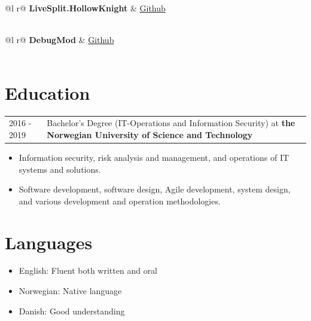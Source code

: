\documentclass[a4paper,12pt]{article}
\begin{document}
\begin{tabularx}{\linewidth}{ @{}l r@{} }
\textbf{LiveSplit.HollowKnight} & \hfill \href{https://github.com/ShootMe/LiveSplit.HollowKnight/tree/master}{Github} \\[3.75pt]
  \\
\end{tabularx}

\begin{tabularx}{\linewidth}{ @{}l r@{} }
\textbf{DebugMod} & \hfill \href{https://github.com/cerpintext/DebugMod}{Github} \\[3.75pt]
  \\
\end{tabularx}

\section{Education}
\begin{tabularx}{\linewidth}{@{}l X@{}}	

2016 - 2019 & Bachelor's Degree (IT-Operations and Information Security) at \textbf{the Norwegian University of Science and Technology} \\
\end{tabularx}
\begin{itemize}
    \item Information security, risk analysis and management, and operations of IT systems and solutions.
    \item Software development, software design, Agile development, system design, and various development and operation methodologies.
\end{itemize}

\newpage
\section{Languages}
\begin{itemize}
    \item English: Fluent both written and oral
    \item Norwegian: Native language 
    \item Danish: Good understanding 
\end{itemize}
\end{document}

